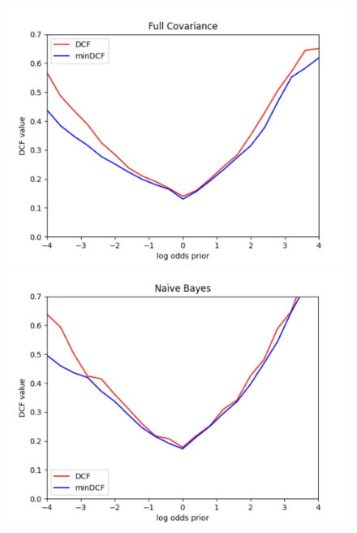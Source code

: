 \documentclass{article}
\begin{document}
\begin{figure}[H]
    \centering
    \begin{minipage}{.3\textwidth}
        \centering
        \includegraphics[width=\linewidth]{./img/full.png}
    \end{minipage}%
    \begin{minipage}{.3\textwidth}
        \centering
        \includegraphics[width=\linewidth]{./img/naive.png}
    \end{minipage}
    \begin{minipage}{.3\textwidth}
        \centering

\end{minipage}
\end{figure}
\end{document}
